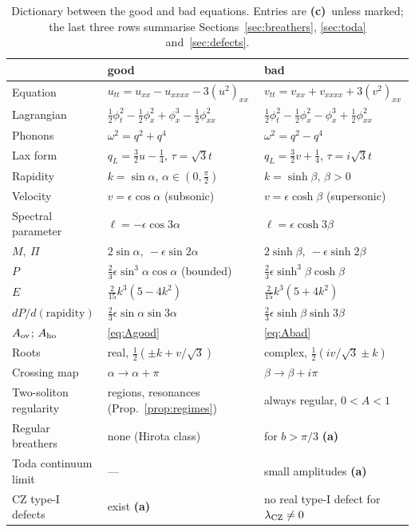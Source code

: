 \documentclass[11pt,a4paper]{article}
\newcommand{\lab}[1]{{\normalfont\sffamily\footnotesize\bfseries(#1)}}
\newcommand{\La}{\lab{a}}
\newcommand{\Lc}{\lab{c}}
\theoremstyle{remark}
\begin{document}
\begin{table}[t]\centering\small
\caption{Dictionary between the good and bad equations. Entries are \Lc\ unless marked; the last three rows summarise Sections~\ref{sec:breathers}, \ref{sec:toda} and~\ref{sec:defects}.}\label{tab:dict}
\renewcommand{\arraystretch}{1.25}
\begin{tabular}{@{}>{\raggedright}p{3.1cm}>{\raggedright}p{5.6cm}>{\raggedright\arraybackslash}p{5.6cm}@{}}
\toprule
& good & bad\\\midrule
Equation & $u_{tt}=u_{xx}-u_{xxxx}-3(u^2)_{xx}$ & $v_{tt}=v_{xx}+v_{xxxx}+3(v^2)_{xx}$\\
Lagrangian & $\tfrac12\phi_t^2-\tfrac12\phi_x^2+\phi_x^3-\tfrac12\phi_{xx}^2$ & $\tfrac12\phi_t^2-\tfrac12\phi_x^2-\phi_x^3+\tfrac12\phi_{xx}^2$\\
Phonons & $\omega^2=q^2+q^4$ & $\omega^2=q^2-q^4$\\
Lax form & $q_L=\tfrac32u-\tfrac14$, $\tau=\sqrt3t$ & $q_L=\tfrac32v+\tfrac14$, $\tau=i\sqrt3t$\\
Rapidity & $k=\sin\alpha$, $\alpha\in(0,\frac\pi2)$ & $k=\sinh\beta$, $\beta>0$\\
Velocity & $v=\epsilon\cos\alpha$ (subsonic) & $v=\epsilon\cosh\beta$ (supersonic)\\
Spectral parameter & $\ell=-\epsilon\cos3\alpha$ & $\ell=\epsilon\cosh3\beta$\\
$M,\ \Pi$ & $2\sin\alpha,\ -\epsilon\sin2\alpha$ & $2\sinh\beta,\ -\epsilon\sinh2\beta$\\
$P$ & $\tfrac23\epsilon\sin^3\!\alpha\cos\alpha$ (bounded) & $\tfrac23\epsilon\sinh^3\!\beta\cosh\beta$\\
$E$ & $\tfrac2{15}k^3(5-4k^2)$ & $\tfrac2{15}k^3(5+4k^2)$\\
$dP/d(\text{rapidity})$ & $\tfrac23\epsilon\sin\alpha\sin3\alpha$ & $\tfrac23\epsilon\sinh\beta\sinh3\beta$\\
$A_{\rm ov}$; $A_{\rm ho}$ & \eqref{eq:Agood} & \eqref{eq:Abad}\\
Roots & real, $\tfrac12(\pm k+v/\sqrt3)$ & complex, $\tfrac12(iv/\sqrt3\pm k)$\\
Crossing map & $\alpha\to\alpha+\pi$ & $\beta\to\beta+i\pi$\\
Two-soliton regularity & regions, resonances (Prop.~\ref{prop:regimes}) & always regular, $0<A<1$\\
Regular breathers & none (Hirota class) & for $b>\pi/3$ \La~\cite{BC}\\
Toda continuum limit & --- & small amplitudes \La~\cite{Zak}\\
CZ type-I defects & exist \La~\cite{CZ} & no real type-I defect for $\lambda_{\rm CZ}\neq0$\\
\bottomrule
\end{tabular}
\end{table}
\end{document}
